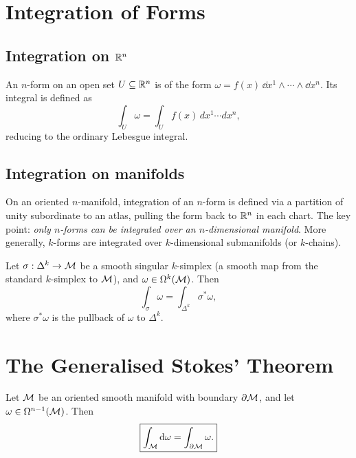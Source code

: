 \section{Integration of Forms}

\subsection{Integration on $\mathbb{R}^n$}

An $n$-form on an open set $U \subseteq \mathbb{R}^n$ is of the form $\omega = f(x)\,\dd x^1 \wedge \cdots \wedge \dd x^n$. Its integral is defined as
\begin{equation}
\int_U \omega = \int_U f(x)\,dx^1\cdots dx^n,
\end{equation}
reducing to the ordinary Lebesgue integral.

\subsection{Integration on manifolds}

On an oriented $n$-manifold, integration of an $n$-form is defined via a partition of unity subordinate to an atlas, pulling the form back to $\mathbb{R}^n$ in each chart. The key point: \emph{only $n$-forms can be integrated over an $n$-dimensional manifold}. More generally, $k$-forms are integrated over $k$-dimensional submanifolds (or $k$-chains).

\begin{definition}
Let $\sigma: \Delta^k \to \mathcal{M}$ be a smooth singular $k$-simplex (a smooth map from the standard $k$-simplex to $\mathcal{M}$), and $\omega \in \Omega^k(\mathcal{M})$. Then
\begin{equation}
\int_\sigma \omega = \int_{\Delta^k} \sigma^*\omega,
\end{equation}
where $\sigma^*\omega$ is the pullback of $\omega$ to $\Delta^k$.
\end{definition}

\section{The Generalised Stokes' Theorem}

\begin{theorem}
Let $\mathcal{M}$ be an oriented smooth manifold with boundary $\partial\mathcal{M}$, and let $\omega \in \Omega^{n-1}(\mathcal{M})$. Then
\begin{equation}
\boxed{\int_{\mathcal{M}} \mathrm{d}\omega = \int_{\partial\mathcal{M}} \omega.}
\end{equation}
\end{theorem}

